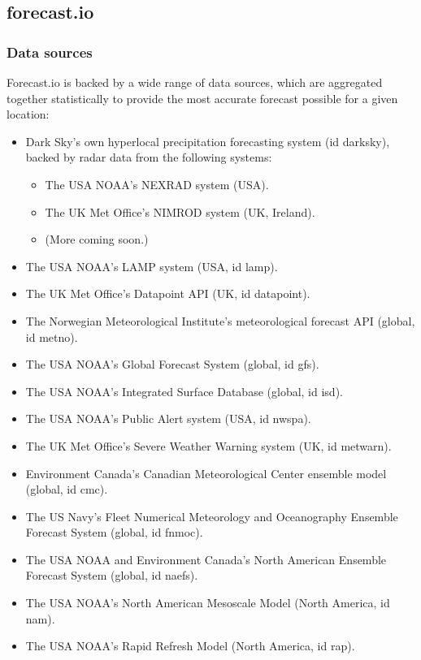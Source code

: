 \documentclass[11pt]{article}
\begin{document}
\subsection{forecast.io}
\label{sec-2-6}

\subsubsection{Data sources}
\label{sec-2-6-1}
Forecast.io is backed by a wide range of data sources, which are
aggregated together statistically to provide the most accurate
forecast possible for a given location:

\begin{itemize}
\item Dark Sky’s own hyperlocal precipitation forecasting system (id darksky), backed by radar data from the following systems:
\begin{itemize}
\item The USA NOAA’s NEXRAD system (USA).
\item The UK Met Office’s NIMROD system (UK, Ireland).
\item (More coming soon.)
\end{itemize}
\item The USA NOAA’s LAMP system (USA, id lamp).
\item The UK Met Office’s Datapoint API (UK, id datapoint).
\item The Norwegian Meteorological Institute’s meteorological forecast API (global, id metno).
\item The USA NOAA’s Global Forecast System (global, id gfs).
\item The USA NOAA’s Integrated Surface Database (global, id isd).
\item The USA NOAA’s Public Alert system (USA, id nwspa).
\item The UK Met Office’s Severe Weather Warning system (UK, id metwarn).
\item Environment Canada’s Canadian Meteorological Center ensemble model (global, id cmc).
\item The US Navy’s Fleet Numerical Meteorology and Oceanography Ensemble Forecast System (global, id fnmoc).
\item The USA NOAA and Environment Canada’s North American Ensemble Forecast System (global, id naefs).
\item The USA NOAA’s North American Mesoscale Model (North America, id nam).
\item The USA NOAA’s Rapid Refresh Model (North America, id rap).

\end{itemize}
\end{document}

